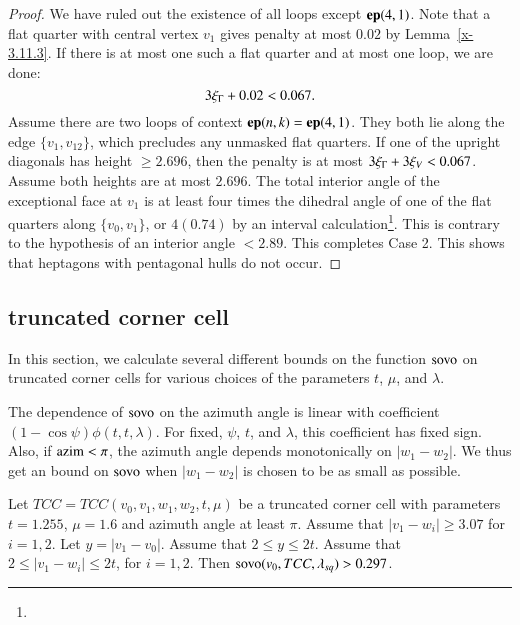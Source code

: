 \begin{proof}
We have ruled out the existence of all loops except ${\operatorname{\bf ep}}{(4,1)}$. Note
that a flat quarter with central vertex $v_1$ gives penalty at
most $0.02$ by Lemma~\ref{x-3.11.3}.
  If there is at most one
such a flat quarter and at most one loop, we are done:
$$3\xi_\Gamma + 0.02 < 0.067.$$
Assume there are two loops of context ${\operatorname{\bf ep}}{(n,k)}={\operatorname{\bf ep}}{(4,1)}$.  They both
lie along the edge $\{v_1,v_{12}\}$, which precludes any unmasked
flat quarters. If one of the upright diagonals has height
$\ge2.696$, then the penalty is at most $3\xi_\Gamma+3\xi_V< 0.067$.
Assume both heights are at most $2.696$. The total interior angle
of the exceptional face at $v_1$ is at least four times the
dihedral angle of one of the flat quarters along $\{v_0,v_1\}$, or
$4(0.74)$ by an interval calculation\footnote{}. This is
contrary to the hypothesis of an interior angle $<2.89$.   This
completes Case 2. This shows that heptagons with pentagonal hulls
do not occur.
\end{proof}



\subsection{truncated corner cell}

In this section, we calculate several different bounds
on the function ${\operatorname{sovo}}$ on truncated corner cells for
various choices of the parameters $t$, $\mu$, and $\lambda$.

The dependence of ${\operatorname{sovo}}$ on the azimuth angle
is linear with coefficient $(1-\cos\psi)\phi(t,t,\lambda)$.
For fixed, $\psi$, $t$, and $\lambda$, this coefficient
has fixed sign.  Also, if ${\operatorname{azim}}<\pi$, the azimuth
angle depends monotonically on $|w_1-w_2|$.  We thus get
an bound on ${\operatorname{sovo}}$ 
when $|w_1-w_2|$ is chosen to be as small as possible.

\medskip

\begin{lemma} 
Let $TCC=TCC(v_0,v_1,w_1,w_2,t,\mu)$ 
be a truncated corner cell with
parameters $t=1.255$, $\mu=1.6$ and azimuth angle at least $\pi$. 
Assume that $|v_1-w_i|\ge 3.07$ for $i=1,2$.
Let $y=|v_1-v_0|$.  Assume that $2\le y\le 2t$.
Assume that $2\le |v_1-w_i|\le 2t$, for $i=1,2$.
Then ${\operatorname{sovo}}(v_0,TCC,\lambda_{sq}) > 0.297$.
\end{lemma}

